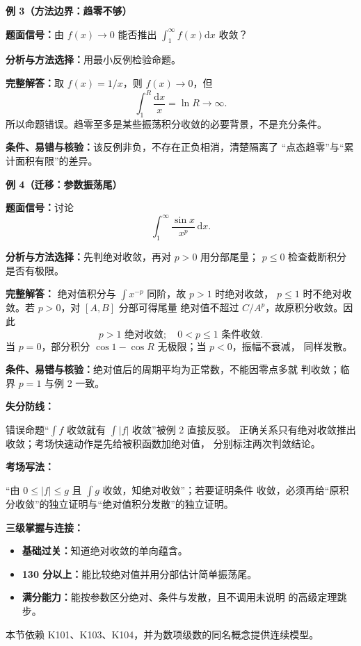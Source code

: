 \begin{knowledgeBox}
\textbf{例 3（方法边界：趋零不够）}

\textbf{题面信号：}由 \(f(x)\to0\) 能否推出
\(\int_1^\infty f(x)\mathrm dx\) 收敛？

\textbf{分析与方法选择：}用最小反例检验命题。

\textbf{完整解答：}取 \(f(x)=1/x\)，则 \(f(x)\to0\)，但
\[
\int_1^R\frac{\mathrm dx}{x}=\ln R\to\infty.
\]
所以命题错误。趋零至多是某些振荡积分收敛的必要背景，不是充分条件。

\textbf{条件、易错与核验：}该反例非负，不存在正负相消，清楚隔离了
“点态趋零”与“累计面积有限”的差异。

\textbf{例 4（迁移：参数振荡尾）}

\textbf{题面信号：}讨论
\[
\int_1^\infty\frac{\sin x}{x^p}\,\mathrm dx.
\]

\textbf{分析与方法选择：}先判绝对收敛，再对 \(p>0\) 用分部尾量；
\(p\le0\) 检查截断积分是否有极限。

\textbf{完整解答：}
绝对值积分与 \(\int x^{-p}\) 同阶，故 \(p>1\) 时绝对收敛，
\(p\le1\) 时不绝对收敛。若 \(p>0\)，对 \([A,B]\) 分部可得尾量
绝对值不超过 \(C/A^p\)，故原积分收敛。因此
\[
\boxed{p>1\text{ 绝对收敛};\quad0<p\le1\text{ 条件收敛}.}
\]
当 \(p=0\)，部分积分 \(\cos1-\cos R\) 无极限；当 \(p<0\)，振幅不衰减，
同样发散。

\textbf{条件、易错与核验：}绝对值后的周期平均为正常数，不能因零点多就
判收敛；临界 \(p=1\) 与例 2 一致。

\textbf{失分防线：}

错误命题“\(\int f\) 收敛就有 \(\int|f|\) 收敛”被例 2 直接反驳。
正确关系只有绝对收敛推出收敛；考场快速动作是先给被积函数加绝对值，
分别标注两次判敛结论。

\textbf{考场写法：}

“由 \(0\le|f|\le g\) 且 \(\int g\) 收敛，知绝对收敛”；若要证明条件
收敛，必须再给“原积分收敛”的独立证明与“绝对值积分发散”的独立证明。

\textbf{三级掌握与连接：}
\begin{itemize}
  \item \textbf{基础过关：}知道绝对收敛的单向蕴含。
  \item \textbf{130 分以上：}能比较绝对值并用分部估计简单振荡尾。
  \item \textbf{满分能力：}能按参数区分绝对、条件与发散，且不调用未说明
  的高级定理跳步。
\end{itemize}
本节依赖 K101、K103、K104，并为数项级数的同名概念提供连续模型。
\end{knowledgeBox}

